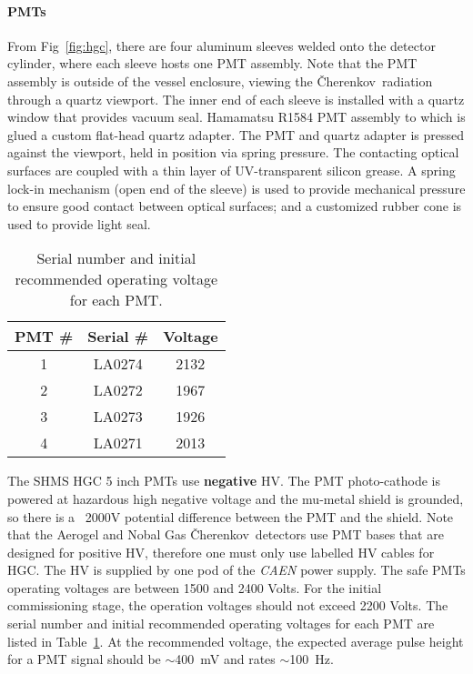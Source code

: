 \documentclass[12pt]{article}
\newcommand{\Cerenkov}{\v{C}herenkov~}
\begin{document}
\paragraph{PMTs} From Fig~\ref{fig:hgc}, there are four aluminum sleeves welded onto the detector cylinder, where each sleeve hosts one PMT assembly. Note that the PMT assembly is outside of the vessel enclosure, viewing the \Cerenkov radiation through a quartz viewport. The inner end of each sleeve is installed with a quartz window that provides vacuum seal. Hamamatsu R1584 PMT assembly to which is glued a custom flat-head quartz adapter. The PMT and quartz adapter is pressed against the viewport, held in position via spring pressure. The contacting optical surfaces are coupled with a thin layer of UV-transparent silicon grease. A spring lock-in mechanism (open end of the sleeve) is used to provide mechanical pressure to ensure good contact between optical surfaces; and a customized rubber cone is used to provide light seal.  


\begin{table}[t]
\centering
  \begin{tabular}{ |c | c | c |}
    \hline
    PMT \#    & Serial \# & Voltage \\ \hline
    1         & LA0274    & 2132    \\ \hline
    2         & LA0272    & 1967    \\ \hline
    3         & LA0273    & 1926    \\ \hline
    4         & LA0271    & 2013    \\
    \hline
  \end{tabular}
  \caption{Serial number and initial recommended operating voltage for each PMT.} 
  \label{tab:hgc_volt}
\end{table}

   

The SHMS HGC 5 inch PMTs use {\bf negative} HV. The PMT photo-cathode is powered at hazardous high negative voltage and the mu-metal shield is grounded, so there is a ~2000V potential difference between the PMT and the shield. Note that the Aerogel and Nobal Gas \Cerenkov detectors use PMT bases that are designed for positive HV, therefore one must only use labelled HV cables for HGC. The HV is supplied by one pod of the {\em CAEN} power supply. The safe PMTs operating voltages are between 1500 and 2400 Volts. For the initial commissioning stage, the operation voltages should not exceed 2200 Volts. The serial number and initial recommended operating voltages for each PMT are listed in Table~\ref{tab:hgc_volt}. At the recommended voltage, the expected average pulse height for a PMT signal should be $\sim$400~mV and rates $\sim$100~Hz.  
\end{document}

